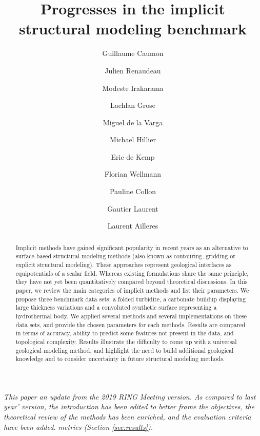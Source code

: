 \documentclass[final]{ring20}
\title{Progresses in the implicit structural modeling benchmark}
\author[1]{Guillaume Caumon}
\author[1,2]{Julien Renaudeau}
\author[1]{Modeste Irakarama}
\author[3]{Lachlan Grose}
\author[5]{Miguel de la Varga}
\author[7]{Michael Hillier}
\author[7]{Eric de Kemp}
\author[5]{Florian Wellmann}
\author[1]{Pauline Collon}
\author[4]{Gautier Laurent}
\author[3]{Laurent Ailleres}
\affil[1]{RING, GeoRessources / ENSG, Universit\'e de Lorraine / CNRS, France}
\affil[2]{Schlumberger, France}
\affil[3]{Monash University, Australia}
\affil[4]{Univ. Orl\'eans, CNRS, BRGM, ISTO, France}
\affil[5]{RWTH Aachen, Germany}
\affil[6]{BRGM, France}
\affil[7]{NRCan, Canada}
\begin{document}
\maketitle

\begin{abstract}

Implicit methods have gained significant popularity in recent years as 
an alternative to surface-based structural modeling methods (also known as 
contouring, gridding or explicit structural modeling). These approaches represent 
geological interfaces as equipotentials of a scalar field. 
Whereas existing formulations share the same principle, they have not yet been 
quantitatively compared beyond theoretical discussions. In this paper, we review 
the main categories of implicit methods and list their parameters. We propose 
three benchmark data sets: a folded turbidite, a carbonate buildup 
displaying large thickness variations and a convoluted synthetic surface 
representing a hydrothermal body. We applied several methods and several 
implementations on these data sets, and provide the chosen parameters for each 
methods. Results are compared in terms of accuracy, ability to predict 
some features not present in the data, and topological complexity. 
Results illustrate the difficulty to come up with a universal geological 
modeling method, and highlight the need to build additional geological 
knowledge and to consider uncertainty in future structural modeling methods.  

\end{abstract}




\textit{This paper an update from the 2019 RING Meeting version. As compared to last year' version, the introduction has been edited to better frame the objectives, the theoretical review of the methods has been enriched, and the evaluation criteria have been added.  
metrics (Section \ref{sec:results}).}
\end{document}
